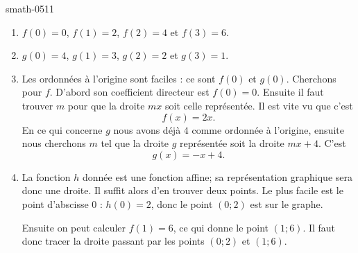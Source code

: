 
\begin{corrige}{smath-0511}

    \begin{enumerate}
        \item
            \( f(0)=0\), \( f(1)=2\), \( f(2)=4\) et \( f(3)=6\).
        \item
            \( g(0)=4\), \( g(1)=3\), \( g(2)=2\) et \( g(3)=1\).
        \item
            Les ordonnées à l'origine sont faciles : ce sont \( f(0)\) et \( g(0)\). Cherchons pour \( f\). D'abord son coefficient directeur est \( f(0)=0\). Ensuite il faut trouver \( m\) pour que la droite \( mx\) soit celle représentée. Il est vite vu que c'est
            \begin{equation}
                f(x)=2x.
            \end{equation}
            En ce qui concerne \( g\) nous avons déjà \( 4\) comme ordonnée à l'origine, ensuite nous cherchons \( m\) tel que la droite \( g\) représentée soit la droite \( mx+4\). C'est
            \begin{equation}
                g(x)=-x+4.
            \end{equation}
        \item
            La fonction \( h\) donnée est une fonction affine; sa représentation graphique sera donc une droite. Il suffit alors d'en trouver deux points. Le plus facile est le point d'abscisse \( 0\) : \( h(0)=2\), donc le point \( (0;2)\) est sur le graphe.

            Ensuite on peut calculer \( f(1)=6\), ce qui donne le point \( (1;6)\). Il faut donc tracer la droite passant par les points \( (0;2)\) et \(   (1;6)\).

    \end{enumerate}

\end{corrige}
